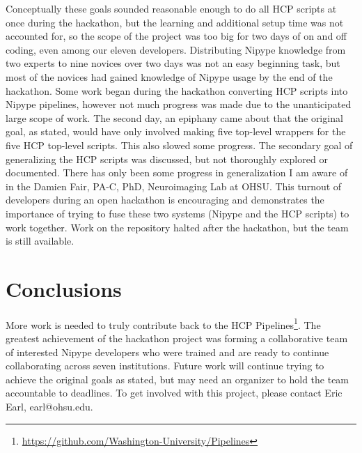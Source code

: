 \documentclass[twocolumn]{bmcart}%
\begin{document}
Conceptually these goals sounded reasonable enough to do all HCP scripts
at once during the hackathon, but the learning and additional setup time
was not accounted for, so the scope of the project was too big for two
days of on and off coding, even among our eleven developers.
Distributing Nipype knowledge from two experts to nine novices over two
days was not an easy beginning task, but most of the novices had gained
knowledge of Nipype usage by the end of the hackathon. Some work began
during the hackathon converting HCP scripts into Nipype pipelines,
however not much progress was made due to the unanticipated large scope
of work. The second day, an epiphany came about that the original goal,
as stated, would have only involved making five top-level wrappers for
the five HCP top-level scripts. This also slowed some progress. The
secondary goal of generalizing the HCP scripts was discussed, but not
thoroughly explored or documented. There has only been some progress in
generalization I am aware of in the Damien Fair, PA-C, PhD, Neuroimaging
Lab at OHSU. This turnout of developers during an open hackathon is
encouraging and demonstrates the importance of trying to fuse these two
systems (Nipype and the HCP scripts) to work together. Work on the
repository halted after the hackathon, but the team is still available.

\section{Conclusions}\label{conclusions}

More work is needed to truly contribute back to the HCP
Pipelines\footnote{\url{https://github.com/Washington-University/Pipelines}}.
The greatest achievement of the hackathon project was forming a
collaborative team of interested Nipype developers who were trained and
are ready to continue collaborating across seven institutions. Future
work will continue trying to achieve the original goals as stated, but
may need an organizer to hold the team accountable to deadlines. To get
involved with this project, please contact Eric Earl, earl@ohsu.edu.

\end{document}
